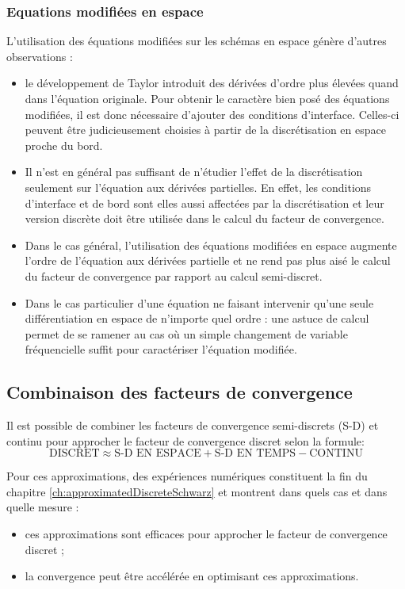 \subsubsection*{Equations modifiées en espace}
L'utilisation des équations modifiées sur les schémas en espace
génère d'autres observations :
\begin{itemize}
	\item 
	le développement de Taylor introduit des dérivées
d'ordre plus élevées quand dans l'équation originale. Pour
obtenir le caractère bien posé des équations modifiées, il est donc
nécessaire d'ajouter des conditions d'interface. Celles-ci peuvent
être judicieusement choisies à partir de la discrétisation en espace
proche du bord.
	\item Il n'est en général pas suffisant de n'étudier
		l'effet de la discrétisation seulement sur
		l'équation aux dérivées partielles. En effet,
		les conditions d'interface et de bord sont
		elles aussi affectées par la discrétisation et
		leur version discrète doit être utilisée
		dans le calcul du facteur de convergence.
	\item Dans le cas général, l'utilisation des équations
	modifiées en espace augmente l'ordre de l'équation aux
	dérivées partielle et ne rend pas plus aisé
	le calcul du facteur de convergence par rapport
		au calcul semi-discret.
	\item Dans le cas particulier d'une équation ne faisant
	intervenir
	qu'une seule différentiation en espace de n'importe
	quel ordre :
	une astuce de calcul permet de se ramener au cas où un simple
	changement de variable fréquencielle suffit pour caractériser
		l'équation modifiée.
\end{itemize}
%
\subsection*{Combinaison des facteurs de convergence}
Il est possible de combiner les facteurs
de convergence semi-discrets (S-D) et continu pour approcher le
facteur de convergence discret selon la formule:
\begin{equation}
	\text{DISCRET} \approx
	\text{S-D EN ESPACE} +
	\text{S-D EN TEMPS} -
	\text{CONTINU}
\end{equation}
%
\par
Pour ces approximations, des expériences numériques constituent la fin
du chapitre \ref{ch:approximatedDiscreteSchwarz} et montrent dans quels cas et dans quelle mesure :
\begin{itemize}
	\item
ces approximations sont efficaces pour approcher le facteur
de convergence discret ;
	\item
la convergence
peut être accélérée en optimisant ces approximations.
\end{itemize}
